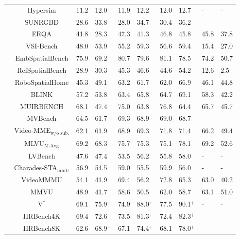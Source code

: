{\begin{table}[htp]
\begin{adjustbox}{max width=1\textwidth}
\begin{NiceTabular}{c|c|w{c}{1cm}w{c}{1cm}|w{c}{1cm}w{c}{1cm}|w{c}{1cm}w{c}{1cm}|w{c}{1cm}w{c}{1cm}}
&Hypersim& 11.2 & 12.0 & 11.9 & 12.2 & 12.0 & 12.7 &  -   &  -   \\
&SUNRGBD & 28.6 & 33.8 & 28.0 & 34.7 & 30.4 & 36.2 &  -   &  -   \\
\midrule
{}
&ERQA & 41.8 & 28.3 & 47.3 & 41.3 & 46.8 & 45.8 & 45.8 & 37.8 \\
&VSI-Bench & 48.0 & 53.9 & 55.2 & 59.3 & 56.6 & 59.4 & 15.4 & 27.0 \\
&EmbSpatialBench & 75.9 & 69.2 & 80.7 & 79.6 & 81.1 & 78.5 & 74.2 & 50.7 \\
&RefSpatialBench & 28.9 & 30.3 & 45.3 & 46.6 & 44.6 & 54.2 & 12.6 & 2.5 \\
&RoboSpatialHome & 45.3 & 49.1 & 63.2 & 61.7 & 62.0 & 66.9 & 46.1 & 44.8 \\
\midrule
{}
&BLINK & 57.2 & 53.8 & 63.4 & 65.8 & 64.7 & 69.1 & 58.3 & 42.2 \\
&MUIRBENCH & 68.1 & 47.4 & 75.0 & 63.8 & 76.8 & 64.4 & 65.7 & 45.7 \\
\midrule
{}
&MVBench                        & 64.5 & 61.7 & 69.3 & 68.9 & 69.0 & 68.7 &  -   &  -   \\
&Video-MME$_{\text{w/o sub.}}$  & 62.1 & 61.9 & 68.9 & 69.3 & 71.8 & 71.4 & 66.2 & 49.4 \\
&MLVU$_{\text{M-Avg}}$          & 69.2 & 68.3 & 75.7 & 75.3 & 75.1 & 78.1 & 69.2 & 52.6 \\
&LVBench                        & 47.6 & 47.4 & 53.5 & 56.2 & 55.8 & 58.0 &  -   &  -   \\
&Charades-STA$_{\text{mIoU}}$   & 56.9 & 54.5 & 59.0 & 55.5 & 59.9 & 56.0 &  -   &  -   \\
&VideoMMMU                      & 54.1 & 41.9 & 69.4 & 56.2 & 72.8 & 65.3 &  63.0   &  40.2   \\
&MMVU                      & 48.9 & 41.7 & 58.6 & 50.5 & 62.0 & 58.7 & 63.1 & 51.0 \\
\midrule
{}
&V$^*$ & 69.1 & 75.9$^+$ & 74.9 & 88.0$^+$ & 77.5 & 90.1$^+$ &  -   &  -   \\  
&HRBench4K  & 69.4 & 72.6$^+$ &  73.5 & 81.3$^+$ & 72.4 & 82.3$^+$ & - & - \\
&HRBench8K & 62.6 & 68.9$^+$ & 67.1 & 74.4$^+$ & 68.1 & 78.0$^+$ & - & - \\

\end{NiceTabular}
\end{adjustbox}
\end{table}}

